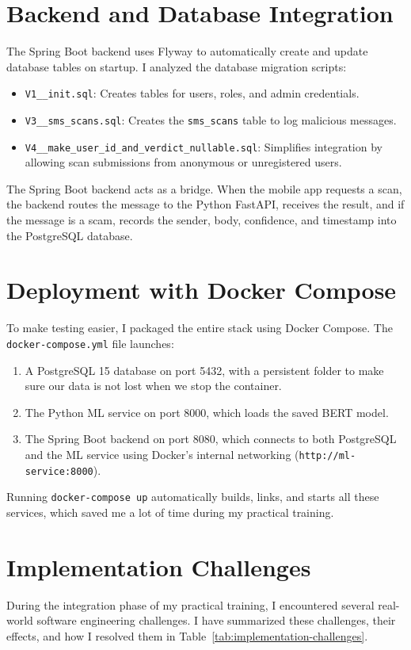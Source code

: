 \section{Backend and Database Integration}
The Spring Boot backend uses Flyway to automatically create and update database tables on startup. I analyzed the database migration scripts:
\begin{itemize}
  \item \texttt{V1__init.sql}: Creates tables for users, roles, and admin credentials.
  \item \texttt{V3__sms_scans.sql}: Creates the \texttt{sms_scans} table to log malicious messages.
  \item \texttt{V4__make_user_id_and_verdict_nullable.sql}: Simplifies integration by allowing scan submissions from anonymous or unregistered users.
\end{itemize}

The Spring Boot backend acts as a bridge. When the mobile app requests a scan, the backend routes the message to the Python FastAPI, receives the result, and if the message is a scam, records the sender, body, confidence, and timestamp into the PostgreSQL database.

\section{Deployment with Docker Compose}
To make testing easier, I packaged the entire stack using Docker Compose. The \texttt{docker-compose.yml} file launches:
\begin{enumerate}
  \item A PostgreSQL 15 database on port 5432, with a persistent folder to make sure our data is not lost when we stop the container.
  \item The Python ML service on port 8000, which loads the saved BERT model.
  \item The Spring Boot backend on port 8080, which connects to both PostgreSQL and the ML service using Docker's internal networking (\texttt{http://ml-service:8000}).
\end{enumerate}

Running \texttt{docker-compose up} automatically builds, links, and starts all these services, which saved me a lot of time during my practical training.

\section{Implementation Challenges}
During the integration phase of my practical training, I encountered several real-world software engineering challenges. I have summarized these challenges, their effects, and how I resolved them in Table~\ref{tab:implementation-challenges}.

